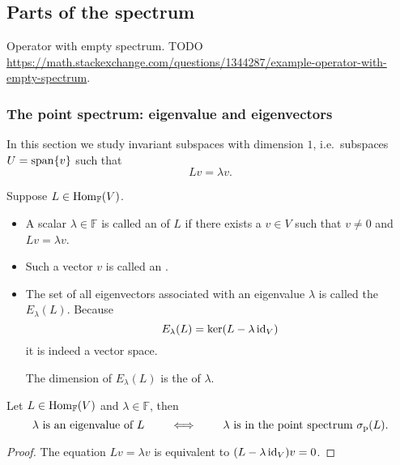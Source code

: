 \subsection{Parts of the spectrum}

\begin{example}
Operator with empty spectrum. TODO \url{https://math.stackexchange.com/questions/1344287/example-operator-with-empty-spectrum}.
\end{example}

\subsubsection{The point spectrum: eigenvalue and eigenvectors}
In this section we study invariant subspaces with dimension $1$, i.e.\ subspaces $U= \operatorname{span}\{v\}$ such that
\[ Lv = \lambda v. \]
\begin{definition}
Suppose $L\in \operatorname{Hom}_{\mathbb{F}}(V)$.
\begin{itemize}
\item  A scalar $\lambda\in \mathbb{F}$ is called an  of $L$ if there exists a $v\in V$ such that $v\neq 0$ and $Lv = \lambda v$.
\item Such a vector $v$ is called an .
\item The set of all eigenvectors associated with an eigenvalue $\lambda$ is called the  $E_\lambda(L)$. Because
\[ E_\lambda(L) = \ker(L-\lambda \operatorname{id}_V) \]
it is indeed a vector space.

The dimension of $E_\lambda(L)$ is the  of $\lambda$.
\end{itemize}
\end{definition}
\begin{proposition}
Let $L\in \operatorname{Hom}_\mathbb{F}(V)$ and $\lambda\in \mathbb{F}$, then
\[ \text{$\lambda$ is an eigenvalue of $L$} \qquad \iff \qquad \text{$\lambda$ is in the point spectrum $\sigma_\text{p}(L)$.} \]
\end{proposition}
\begin{proof}
The equation $Lv = \lambda v$ is equivalent to $(L-\lambda \operatorname{id}_V)v = 0$.
\end{proof}

